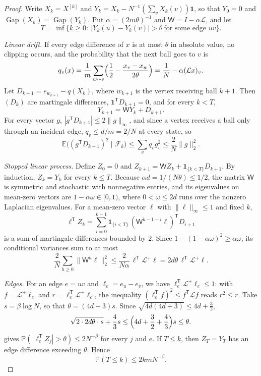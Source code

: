 \documentclass[11pt]{article}
\theoremstyle{remark}
\newcommand{\E}{\mathbb{E}}
\newcommand{\Pp}{\mathbb{P}}
\newcommand{\one}{\mathbf{1}}
\newcommand{\Gap}{\operatorname{Gap}}
\newcommand{\norm}[1]{\lVert #1\rVert}
\begin{document}
\begin{proof}
Write $X_k=X^{[k]}$ and $Y_k=X_k-N^{-1}(\sum_vX_k(v))\one$, so that $Y_0=0$ and $\Gap(X_k)=\Gap(Y_k)$. Put $\alpha=(2m\theta)^{-1}$ and $\mathsf{W}=I-\alpha\mathcal L$, and let
\[
 T=\inf\{k\ge0:\ |Y_k(u)-Y_k(v)|>\theta\ \text{for some edge }uv\}.
\]

\emph{Linear drift.} If every edge difference of $x$ is at most $\theta$ in absolute value, no clipping occurs, and the probability that the next ball goes to $v$ is
\[
 q_v(x)=\frac1m\sum_{w\sim v}\Bigl(\frac12-\frac{x_v-x_w}{2\theta}\Bigr)=\frac1N-\alpha(\mathcal Lx)_v.
\]
Let $D_{k+1}=e_{w_{k+1}}-q(X_k)$, where $w_{k+1}$ is the vertex receiving ball $k+1$. Then $(D_k)$ are martingale differences, $\one^{\mathsf T}D_{k+1}=0$, and for every $k<T$,
\[
 Y_{k+1}=\mathsf{W}Y_k+D_{k+1}.
\]
For every vector $g$, $|g^{\mathsf T}D_{k+1}|\le2\norm{g}_\infty$, and since a vertex receives a ball only through an incident edge, $q_v\le d/m=2/N$ at every state, so
\[
 \E\bigl((g^{\mathsf T}D_{k+1})^2\mid\mathcal F_k\bigr)\le\sum_vq_v g_v^2\le\frac2N\norm{g}_2^2.
\]

\emph{Stopped linear process.} Define $Z_0=0$ and $Z_{k+1}=\mathsf{W}Z_k+\one_{\{k<T\}}D_{k+1}$. By induction, $Z_k=Y_k$ for every $k\le T$. Because $\alpha d=1/(N\theta)\le1/2$, the matrix $\mathsf{W}$ is symmetric and stochastic with nonnegative entries, and its eigenvalues on mean-zero vectors are $1-\alpha\omega\in[0,1)$, where $0<\omega\le2d$ runs over the nonzero Laplacian eigenvalues. For a mean-zero vector $\ell$ with $\norm{\ell}_\infty\le1$ and fixed $k$,
\[
 \ell^{\mathsf T}Z_k=\sum_{i=0}^{k-1}\one_{\{i<T\}}\,(\mathsf{W}^{k-1-i}\ell)^{\mathsf T}D_{i+1}
\]
is a sum of martingale differences bounded by $2$. Since $1-(1-\alpha\omega)^2\ge\alpha\omega$, its conditional variances sum to at most
\[
 \frac2N\sum_{h\ge0}\norm{\mathsf{W}^h\ell}_2^2\le\frac2{N\alpha}\,\ell^{\mathsf T}\mathcal L^+\ell
 =2d\theta\,\ell^{\mathsf T}\mathcal L^+\ell.
 \tag{8.3}\label{eq:smoothed-budget}
\]

\emph{Edges.} For an edge $e=uv$ and $\ell_e=e_u-e_v$, we have $\ell_e^{\mathsf T}\mathcal L^+\ell_e\le1$: with $f=\mathcal L^+\ell_e$ and $r=\ell_e^{\mathsf T}\mathcal L^+\ell_e$, the inequality $(\ell_e^{\mathsf T}f)^2\le f^{\mathsf T}\mathcal Lf$ reads $r^2\le r$. Take $s=\beta\log N$, so that $\theta=(4d+3)s$. Since $\sqrt{4d(4d+3)}\le4d+\frac32$,
\[
 \sqrt{2\cdot2d\theta\cdot s}+\frac43s\le\Bigl(4d+\frac32+\frac43\Bigr)s\le\theta.
\]
 gives $\Pp(|\ell_e^{\mathsf T}Z_j|>\theta)\le2N^{-\beta}$ for every $j$ and $e$. If $T\le k$, then $Z_T=Y_T$ has an edge difference exceeding $\theta$. Hence
\[
 \Pp(T\le k)\le2kmN^{-\beta}.
\]


\end{proof}
\end{document}
